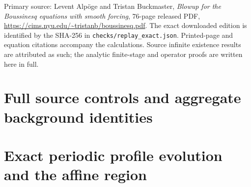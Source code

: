 \documentclass[11pt]{article}
\begin{document}
\medskip
\noindent Primary source: Levent Alp\"oge and Tristan Buckmaster,
\emph{Blowup for the Boussinesq equations with smooth forcing},
76-page released PDF,
\url{https://cims.nyu.edu/~tristanb/boussinesq.pdf}.
The exact downloaded edition is identified by the SHA-256 in
\texttt{checks/replay\_exact.json}. Printed-page and equation
citations accompany the calculations. Source infinite existence
results are attributed as such; the analytic finite-stage and
operator proofs are written here in full.
\setcounter{tocdepth}{1}
\tableofcontents
\clearpage





















\appendix
\clearpage
\section{Full source controls and aggregate background identities}

\clearpage
\section{Exact periodic profile evolution and the affine region}
\begingroup
\let\section\subsection

\endgroup
\end{document}
